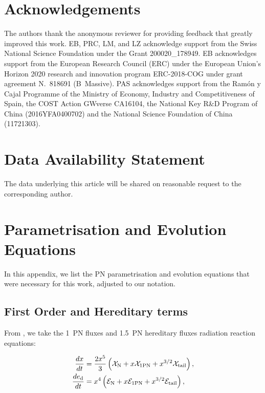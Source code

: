 \documentclass[usenatbib]{mnras}
\begin{document}
\section*{Acknowledgements}
The authors thank the anonymous reviewer for providing feedback that greatly improved this work. EB, PRC, LM, and LZ acknowledge support from the Swiss National Science Foundation under the Grant 200020\_178949. EB  acknowledges support from the European Research Council (ERC) under the European Union's Horizon 2020 research and innovation program ERC-2018-COG
under grant agreement N.~818691 (B~Massive). PAS acknowledges support from the Ram{\'o}n y Cajal Programme of the Ministry of Economy, Industry and Competitiveness of Spain, the COST Action GWverse CA16104, the National Key R\&D Program of China (2016YFA0400702) and the National Science Foundation of China (11721303).

\section*{Data Availability Statement}
The data underlying this article will be shared on reasonable request to the corresponding author.


 
\setlength{\bibhang}{1.6em}
\setlength{}


\normalsize

\appendix

\section{Parametrisation and Evolution Equations}\label{sec:appendix}

In this appendix, we list the PN parametrisation and evolution equations that were necessary for this work, adjusted to our notation.

\subsection*{First Order and Hereditary terms}

From \cite{2019PhRvD.100h4043E}, we take the 1~PN fluxes and 1.5~PN hereditary fluxes radiation reaction equations:

\begin{align}
	\frac{d x}{d t} &= \frac{2 x^5}{3} \left(\mathcal{X}_{\rm N}+ x \mathcal{X}_{\rm{1PN}}  +x^{3/2}\mathcal{X}_{\rm{tail}}\right),\\
	\frac{d e_{\rm d}}{d t} &= x^4 \left(\mathcal{E}_{\rm N}+ x \mathcal{E}_{\rm{1PN}}  +x^{3/2}\mathcal{E}_{\rm{tail}}\right),\\ \nonumber
\end{align}
\end{document}
